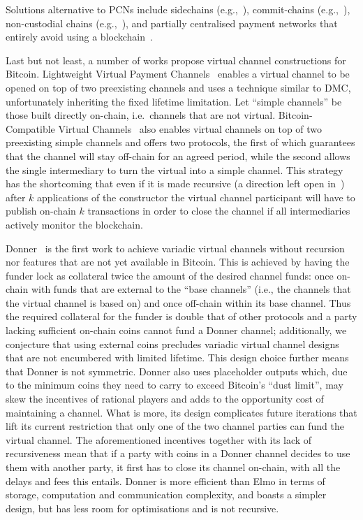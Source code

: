   Solutions alternative to PCNs include side\-chains
  (e.g.,~\cite{BCDF+14,sidechains,KiaZin18}), commit-chains
  (e.g.,~\cite{plasma}), non-custo\-dial chains
  (e.g.,~\cite{plasma,konstantopoulos2019plasma,plasma-lower-bounds}),
  and partially centralised payment networks that entirely avoid using a
  blockchain~\cite{DBLP:conf/trust/ArmknechtKMYZ15,stellar,silentwhispers,DBLP:conf/ndss/RoosMKG18}.

  Last but not least, a number of works propose virtual channel constructions
  for Bitcoin. Lightweight Virtual Payment
  Channels~\cite{10.1007/978-3-030-65411-5_18} enables a virtual channel to be
  opened on top of two preexisting channels and uses a technique similar to DMC,
  unfortunately inheriting the fixed lifetime limitation.
  Let ``simple channels'' be those built directly on-chain, i.e.\ channels that are not
  virtual.
  Bitcoin-Compatible Virtual Channels~\cite{9519487} also enables
  virtual channels on top of two preexisting simple channels
  and offers two protocols, the first of which guarantees that the channel will
  stay off-chain for an agreed period, while the second allows the single intermediary
  to turn the virtual into a simple channel.
  This strategy has the shortcoming that even if it is made
  recursive (a direction left open in~\cite{9519487}) after $k$
  applications of the constructor the virtual channel participant will have to
  publish on-chain $k$ transactions in order to close the channel if all
  intermediaries actively monitor the blockchain.

  Donner~\cite{donner} is the first work to achieve variadic
  virtual channels without recursion nor features that are not yet
  available in Bitcoin. This is achieved by having the funder lock as
  collateral twice the amount of the desired channel funds: once on-chain with
  funds that are external to the ``base channels'' (i.e., the channels that the
  virtual channel is based on) and once off-chain within its base channel. Thus
  the required collateral for the funder is double that of other protocols and
  a party lacking sufficient on-chain coins cannot fund a Donner channel;
  additionally, we conjecture that using external coins precludes variadic
  virtual channel designs that are not encumbered with limited lifetime. This
  design choice further means that Donner is not symmetric. Donner also uses
  placeholder outputs which, due to the minimum coins they need to carry to
  exceed Bitcoin's ``dust limit'', may skew the incentives of rational players
  and adds to the
  opportunity cost of maintaining a channel. What is more, its design complicates
  future iterations that lift its current restriction that only one of the two
  channel parties can fund the virtual channel. The aforementioned incentives
  together with its lack of recursiveness mean that if a party with coins in a
  Donner channel decides to use them with another party, it first has to close
  its channel on-chain, with all the delays and fees this entails. Donner is
  more efficient than Elmo in terms of storage, computation and communication
  complexity, and boasts a simpler design, but has less room for optimisations
  and is not recursive.

